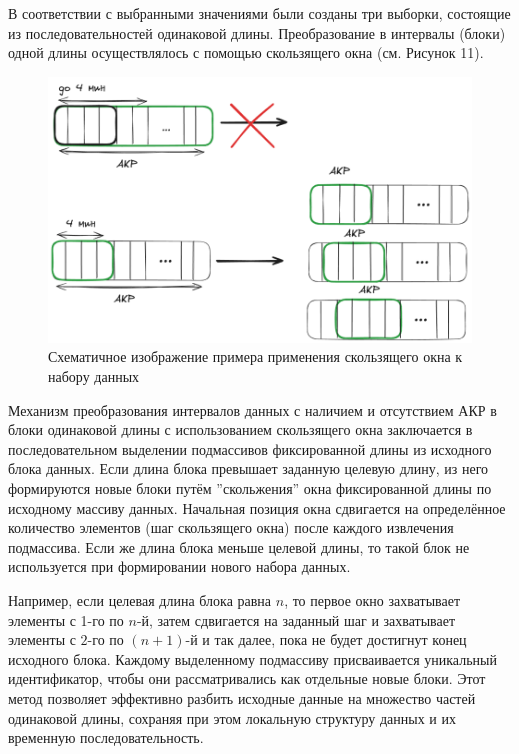 \documentclass[spec, och, diploma]{SCWorks}
\begin{document}
        В соответствии с выбранными значениями были созданы три выборки,
        состоящие из последовательностей одинаковой длины. Преобразование в
        интервалы (блоки) одной длины осуществлялось с помощью скользящего окна
        (см. Рисунок 11).

        \begin{figure}[H]
            \centering
            \includegraphics[width=1\textwidth]{pic/wind.png}
            \caption{Схематичное изображение примера применения скользящего окна к набору данных}
        \end{figure}

        Механизм преобразования интервалов данных с наличием и отсутствием АКР в
        блоки одинаковой длины с использованием скользящего окна заключается в
        последовательном выделении подмассивов фиксированной длины из исходного
        блока данных. Если длина блока превышает заданную целевую длину, из него
        формируются новые блоки путём ''скольжения'' окна фиксированной длины по
        исходному массиву данных. Начальная позиция окна сдвигается на
        определённое количество элементов (шаг скользящего окна) после каждого
        извлечения подмассива. Если же длина блока меньше целевой длины, то
        такой блок не используется при формировании нового набора данных.

        Например, если целевая длина блока равна \(n\), то первое окно
        захватывает элементы с 1-го по \(n\)-й, затем сдвигается на заданный шаг
        и захватывает элементы с \(2\)-го по \((n+1)\)-й и так далее, пока не
        будет достигнут конец исходного блока. Каждому выделенному подмассиву
        присваивается уникальный идентификатор, чтобы они рассматривались как
        отдельные новые блоки. Этот метод позволяет эффективно разбить исходные
        данные на множество частей одинаковой длины, сохраняя при этом локальную
        структуру данных и их временную последовательность.
\end{document}
